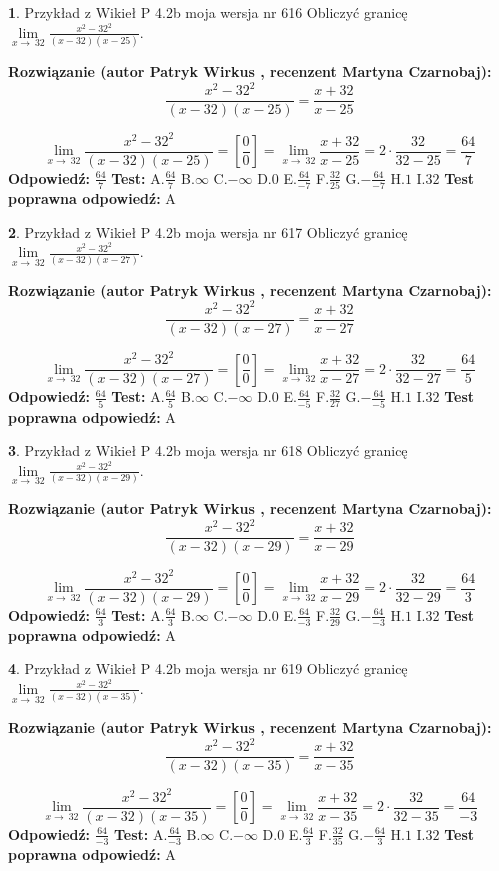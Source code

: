 \documentclass[12pt, a4paper]{article}
\theoremstyle{definition} %
\newtheorem{zad}{}
\newcommand{\zadStart}[1]{\begin{zad}#1\newline}
\newcommand{\zadStop}{\end{zad}}
\newcommand{\rozwStart}[2]{\noindent \textbf{Rozwiązanie (autor #1 , recenzent #2): }\newline}
\newcommand{\rozwStop}{\newline}
\newcommand{\odpStart}{\noindent \textbf{Odpowiedź:}\newline}
\newcommand{\odpStop}{\newline}
\newcommand{\testStart}{\noindent \textbf{Test:}\newline}
\newcommand{\testStop}{\newline}
\newcommand{\kluczStart}{\noindent \textbf{Test poprawna odpowiedź:}\newline}
\newcommand{\kluczStop}{\newline}
\begin{document}
\zadStart{Przykład z Wikieł P 4.2b moja wersja nr 616}
Obliczyć granicę $\lim\limits_{x\to\ 32}\frac{x^{2}-32^{2}}{(x-32)(x-25)}$.
\zadStop
\rozwStart{Patryk Wirkus}{Martyna Czarnobaj}
$$\frac{x^{2}-32^{2}}{(x-32)(x-25)}=\frac{x+32}{x-25}$$

$$\lim\limits_{x\to\ 32}\frac{x^{2}-32^{2}}{(x-32)(x-25)}=[\frac{0}{0}]=\lim\limits_{x\to\ 32}\frac{x+32}{x-25}=2 \cdot \frac{32}{32-25} = \frac{64}{7}$$
\rozwStop
\odpStart
$\frac{64}{7}$
\odpStop
\testStart
A.$\frac{64}{7}$
B.$\infty$
C.$-\infty$
D.$0$
E.$\frac{64}{-7}$
F.$\frac{32}{25}$
G.$-\frac{64}{-7}$
H.$1$
I.$32$
\testStop
\kluczStart
A
\kluczStop



\zadStart{Przykład z Wikieł P 4.2b moja wersja nr 617}
Obliczyć granicę $\lim\limits_{x\to\ 32}\frac{x^{2}-32^{2}}{(x-32)(x-27)}$.
\zadStop
\rozwStart{Patryk Wirkus}{Martyna Czarnobaj}
$$\frac{x^{2}-32^{2}}{(x-32)(x-27)}=\frac{x+32}{x-27}$$

$$\lim\limits_{x\to\ 32}\frac{x^{2}-32^{2}}{(x-32)(x-27)}=[\frac{0}{0}]=\lim\limits_{x\to\ 32}\frac{x+32}{x-27}=2 \cdot \frac{32}{32-27} = \frac{64}{5}$$
\rozwStop
\odpStart
$\frac{64}{5}$
\odpStop
\testStart
A.$\frac{64}{5}$
B.$\infty$
C.$-\infty$
D.$0$
E.$\frac{64}{-5}$
F.$\frac{32}{27}$
G.$-\frac{64}{-5}$
H.$1$
I.$32$
\testStop
\kluczStart
A
\kluczStop



\zadStart{Przykład z Wikieł P 4.2b moja wersja nr 618}
Obliczyć granicę $\lim\limits_{x\to\ 32}\frac{x^{2}-32^{2}}{(x-32)(x-29)}$.
\zadStop
\rozwStart{Patryk Wirkus}{Martyna Czarnobaj}
$$\frac{x^{2}-32^{2}}{(x-32)(x-29)}=\frac{x+32}{x-29}$$

$$\lim\limits_{x\to\ 32}\frac{x^{2}-32^{2}}{(x-32)(x-29)}=[\frac{0}{0}]=\lim\limits_{x\to\ 32}\frac{x+32}{x-29}=2 \cdot \frac{32}{32-29} = \frac{64}{3}$$
\rozwStop
\odpStart
$\frac{64}{3}$
\odpStop
\testStart
A.$\frac{64}{3}$
B.$\infty$
C.$-\infty$
D.$0$
E.$\frac{64}{-3}$
F.$\frac{32}{29}$
G.$-\frac{64}{-3}$
H.$1$
I.$32$
\testStop
\kluczStart
A
\kluczStop



\zadStart{Przykład z Wikieł P 4.2b moja wersja nr 619}
Obliczyć granicę $\lim\limits_{x\to\ 32}\frac{x^{2}-32^{2}}{(x-32)(x-35)}$.
\zadStop
\rozwStart{Patryk Wirkus}{Martyna Czarnobaj}
$$\frac{x^{2}-32^{2}}{(x-32)(x-35)}=\frac{x+32}{x-35}$$

$$\lim\limits_{x\to\ 32}\frac{x^{2}-32^{2}}{(x-32)(x-35)}=[\frac{0}{0}]=\lim\limits_{x\to\ 32}\frac{x+32}{x-35}=2 \cdot \frac{32}{32-35} = \frac{64}{-3}$$
\rozwStop
\odpStart
$\frac{64}{-3}$
\odpStop
\testStart
A.$\frac{64}{-3}$
B.$\infty$
C.$-\infty$
D.$0$
E.$\frac{64}{3}$
F.$\frac{32}{35}$
G.$-\frac{64}{3}$
H.$1$
I.$32$
\testStop
\kluczStart
A
\kluczStop
\end{document}
